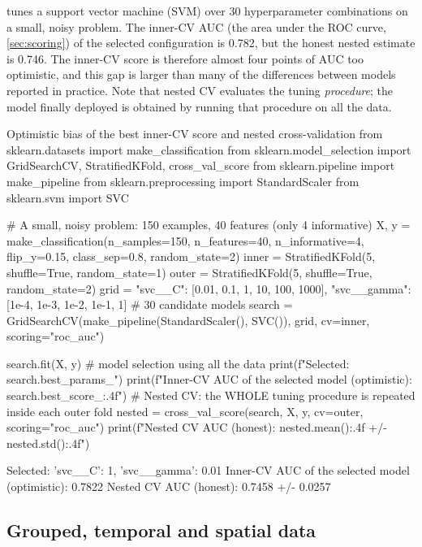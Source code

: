  tunes a support vector machine (SVM) over 30 hyperparameter combinations on a small, noisy problem.
The inner-CV AUC (the area under the ROC curve, \cref{sec:scoring}) of the selected configuration is 0.782, but the honest nested estimate is
0.746. The inner-CV score is therefore almost four points of AUC too optimistic, and this gap is larger than many of the differences between
models reported in practice. Note that nested CV evaluates the tuning \emph{procedure}; the
model finally deployed is obtained by running that procedure on all the data.

\begin{pylisting}[label={lst:nested}]{Optimistic bias of the best inner-CV score and nested cross-validation}
from sklearn.datasets import make_classification
from sklearn.model_selection import GridSearchCV, StratifiedKFold, cross_val_score
from sklearn.pipeline import make_pipeline
from sklearn.preprocessing import StandardScaler
from sklearn.svm import SVC

# A small, noisy problem: 150 examples, 40 features (only 4 informative)
X, y = make_classification(n_samples=150, n_features=40, n_informative=4,
                           flip_y=0.15, class_sep=0.8, random_state=2)
inner = StratifiedKFold(5, shuffle=True, random_state=1)
outer = StratifiedKFold(5, shuffle=True, random_state=2)
grid = {"svc__C": [0.01, 0.1, 1, 10, 100, 1000],
        "svc__gamma": [1e-4, 1e-3, 1e-2, 1e-1, 1]}          # 30 candidate models
search = GridSearchCV(make_pipeline(StandardScaler(), SVC()), grid,
                      cv=inner, scoring="roc_auc")

search.fit(X, y)                     # model selection using all the data
print(f"Selected: {search.best_params_}")
print(f"Inner-CV AUC of the selected model (optimistic): {search.best_score_:.4f}")
# Nested CV: the WHOLE tuning procedure is repeated inside each outer fold
nested = cross_val_score(search, X, y, cv=outer, scoring="roc_auc")
print(f"Nested CV AUC (honest): {nested.mean():.4f} +/- {nested.std():.4f}")
\end{pylisting}
\begin{pyoutput}
Selected: {'svc__C': 1, 'svc__gamma': 0.01}
Inner-CV AUC of the selected model (optimistic): 0.7822
Nested CV AUC (honest): 0.7458 +/- 0.0257
\end{pyoutput}

\subsection{Grouped, temporal and spatial data}

